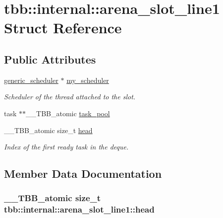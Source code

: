 \hypertarget{structtbb_1_1internal_1_1arena__slot__line1}{}\section{tbb\+:\+:internal\+:\+:arena\+\_\+slot\+\_\+line1 Struct Reference}
\label{structtbb_1_1internal_1_1arena__slot__line1}
\subsection*{Public Attributes}
\begin{DoxyCompactItemize}
\item 
\hyperlink{classtbb_1_1internal_1_1generic__scheduler}{generic\+\_\+scheduler} $\ast$ \hyperlink{structtbb_1_1internal_1_1arena__slot__line1_a988ed3221b0b40efb97849a53b168e79}{my\+\_\+scheduler}
\begin{DoxyCompactList}\small\item\em Scheduler of the thread attached to the slot. \end{DoxyCompactList}\item 
task $\ast$$\ast$\+\_\+\+\_\+\+T\+B\+B\+\_\+atomic \hyperlink{structtbb_1_1internal_1_1arena__slot__line1_a9096bfd9df29790ef46791385c5a8162}{task\+\_\+pool}
\item 
\+\_\+\+\_\+\+T\+B\+B\+\_\+atomic size\+\_\+t \hyperlink{structtbb_1_1internal_1_1arena__slot__line1_a6b0b8214404af0b2c30f442b33d0d209}{head}
\begin{DoxyCompactList}\small\item\em Index of the first ready task in the deque. \end{DoxyCompactList}\end{DoxyCompactItemize}


\subsection{Member Data Documentation}
\hypertarget{structtbb_1_1internal_1_1arena__slot__line1_a6b0b8214404af0b2c30f442b33d0d209}{}
\subsubsection[{head}]{\setlength{\rightskip}{0pt plus 5cm}\+\_\+\+\_\+\+T\+B\+B\+\_\+atomic size\+\_\+t tbb\+::internal\+::arena\+\_\+slot\+\_\+line1\+::head}\label{structtbb_1_1internal_1_1arena__slot__line1_a6b0b8214404af0b2c30f442b33d0d209}


